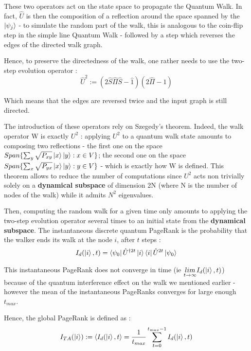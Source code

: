 \documentclass[sn-mathphys]{sn-jnl}%
\theoremstyle{thmstyleone}%
\theoremstyle{thmstyletwo}%
\theoremstyle{thmstylethree}%
\begin{document}
These two operators act on the state space to propagate the Quantum
Walk. In fact, $\hat{U}$ is then the composition of a reflection
around the space spanned by the $\ket{\psi_j}$ - to simulate the
random part of the walk, this is analogous to the coin-flip step in
the simple line Quantum Walk - followed by a step which reverses the
edges of the directed walk graph.

Hence, to preserve the directedness of the walk, one rather needs to
use the two-step evolution operator :
\begin{equation*}
    \hat{U}^2 := (2 \hat{S} \hat{\Pi} \hat{S} - \hat{1})(2 \hat{\Pi} - 1)
\end{equation*}

Which means that the edges are reversed twice and the input graph is
still directed.

The introduction of these operators rely on Szegedy's theorem. Indeed,
the walk operator W is exactly $U^2$ : applying $U^2$ to a quantum
walk state amounts to composing two reflections - the first one on the
space $Span\{\sum_y \sqrt{P_{xy}} \ket{x} \ket{y} : x \in V\}$; the
second one on the space
$Span\{\sum_x \sqrt{P_{yx}} \ket{x} \ket{y} : y \in V\}$ - which is
exactly how W is defined. This theorem allows to reduce the number of
computations since $U^2$ acts non trivially solely on a
\textbf{dynamical subspace} of dimension 2N (where N is the number of
nodes of the walk) while it admits $N^2$ eigenvalues.

Then, computing the random walk for a given time only amounts to
applying the two-step evolution operator several times to an initial
state from the \textbf{dynamical subspace}. The instantaneous discrete
quantum PageRank is the probability that the walker ends its walk at
the node $i$, after $t$ steps :
\begin{equation*}
    I_d(\ket{i}, t) = \bra{\psi_0} \hat{U}^{\dagger 2t} \ket{i} \bra{i} \hat{U}^{2t} \ket{\psi_0}
\end{equation*}

This instantaneous PageRank does not converge in time (ie
$\underset{t\rightarrow\infty}{lim} I_d(\ket{i}, t)$) because of the
quantum interference effect on the walk we mentioned earlier - however
the mean of the instantaneous PageRanks converges for large enough
$t_{max}$.

Hence, the global PageRank is defined as : 
\begin{equation*}
    I_{TA}(\ket{i}) := \braket{I_d(\ket{i}, t}= \frac{1}{t_{max}} \sum_{t=0}^{t_{max}-1} I_d(\ket{i}, t)
\end{equation*}
\end{document}
